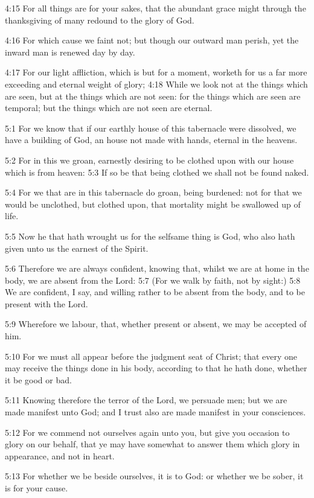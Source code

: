 4:15 For all things are for your sakes, that the abundant grace might
through the thanksgiving of many redound to the glory of God.

4:16 For which cause we faint not; but though our outward man perish,
yet the inward man is renewed day by day.

4:17 For our light affliction, which is but for a moment, worketh for
us a far more exceeding and eternal weight of glory; 4:18 While we
look not at the things which are seen, but at the things which are not
seen: for the things which are seen are temporal; but the things which
are not seen are eternal.

5:1 For we know that if our earthly house of this tabernacle were
dissolved, we have a building of God, an house not made with hands,
eternal in the heavens.

5:2 For in this we groan, earnestly desiring to be clothed upon with
our house which is from heaven: 5:3 If so be that being clothed we
shall not be found naked.

5:4 For we that are in this tabernacle do groan, being burdened: not
for that we would be unclothed, but clothed upon, that mortality might
be swallowed up of life.

5:5 Now he that hath wrought us for the selfsame thing is God, who
also hath given unto us the earnest of the Spirit.

5:6 Therefore we are always confident, knowing that, whilst we are at
home in the body, we are absent from the Lord: 5:7 (For we walk by
faith, not by sight:) 5:8 We are confident, I say, and willing rather
to be absent from the body, and to be present with the Lord.

5:9 Wherefore we labour, that, whether present or absent, we may be
accepted of him.

5:10 For we must all appear before the judgment seat of Christ; that
every one may receive the things done in his body, according to that
he hath done, whether it be good or bad.

5:11 Knowing therefore the terror of the Lord, we persuade men; but we
are made manifest unto God; and I trust also are made manifest in your
consciences.

5:12 For we commend not ourselves again unto you, but give you
occasion to glory on our behalf, that ye may have somewhat to answer
them which glory in appearance, and not in heart.

5:13 For whether we be beside ourselves, it is to God: or whether we
be sober, it is for your cause.

